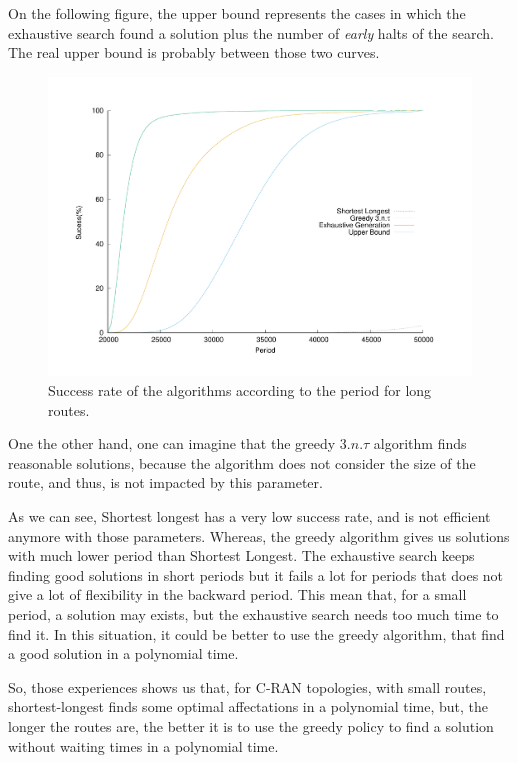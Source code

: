 \documentclass[a4paper,10pt]{article}
\begin{document}
    On the following figure, the upper bound represents the cases in which the exhaustive search found a solution plus the number of {\em early} halts of the search. The real upper bound is probably between those two curves.
\begin{figure}

       \begin{center}
      \includegraphics[scale=0.4]{echec_longues.pdf}
      \end{center}
      \caption{Success rate of the algorithms according to the period for long routes.}
     \end{figure}
      
      
      One the other hand, one can imagine that the greedy $3.n.\tau$ algorithm finds reasonable solutions, because the algorithm does not consider the size of the route, and thus, is not impacted by this parameter.
      
      
      As we can see, Shortest longest has a very low success rate, and is not efficient anymore with those parameters.
      Whereas, the greedy algorithm gives us solutions with much lower period than Shortest Longest. The exhaustive search keeps finding good solutions in short periods but it fails a lot for periods that does not give a lot of flexibility in the backward period. This mean that, for a small period, a solution may exists, but the exhaustive search needs too much time to find it. In this situation, it could be better to use the greedy algorithm, that find a good solution in a polynomial time.

          
      So, those experiences shows us that, for C-RAN topologies, with small routes, shortest-longest finds some optimal affectations in a polynomial time, but, the longer the routes are, the better it is to use the greedy policy to find a solution without waiting times in a polynomial time.\\
    
\end{document}
